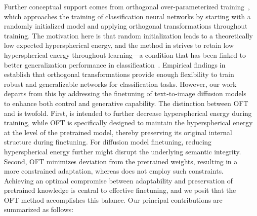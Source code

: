 \begin{itemize}[leftmargin=*,nosep]
Further conceptual support comes from orthogonal over-parameterized training~\cite{liu2021orthogonal}, which approaches the training of classification neural networks by starting with a randomly initialized model and applying orthogonal transformations throughout training. The motivation here is that random initialization leads to a theoretically low expected hyperspherical energy, and the method in \cite{liu2021orthogonal} strives to retain low hyperspherical energy throughout learning—a condition that has been linked to better generalization performance in classification~\cite{liu2018learning,lin2020regularizing}. Empirical findings in \cite{liu2021orthogonal} establish that orthogonal transformations provide enough flexibility to train robust and generalizable networks for classification tasks. However, our work departs from this by addressing the finetuning of text-to-image diffusion models to enhance both control and generative capability. The distinction between OFT and \cite{liu2021orthogonal} is twofold. First, \cite{liu2021orthogonal} is intended to further decrease hyperspherical energy during training, while OFT is specifically designed to maintain the hyperspherical energy at the level of the pretrained model, thereby preserving its original internal structure during finetuning. For diffusion model finetuning, reducing hyperspherical energy further might disrupt the underlying semantic integrity. Second, OFT minimizes deviation from the pretrained weights, resulting in a more constrained adaptation, whereas \cite{liu2021orthogonal} does not employ such constraints. Achieving an optimal compromise between adaptability and preservation of pretrained knowledge is central to effective finetuning, and we posit that the OFT method accomplishes this balance. Our principal contributions are summarized as follows:


\end{itemize}
